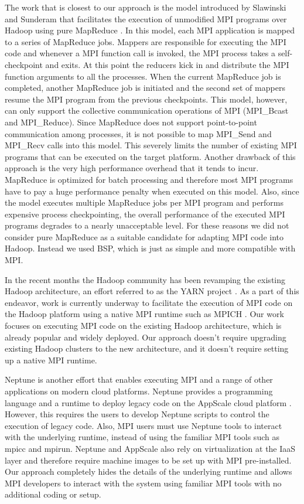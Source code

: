 \documentclass[conference,10pt] {IEEEtran}
\begin{document}
The work that is closest to our approach is the model introduced by Slawinski and Sunderam that facilitates the execution of unmodified MPI programs over Hadoop using pure MapReduce \cite{SS12}. In this model, each MPI application is mapped to a series of MapReduce jobs. Mappers are responsible for executing the MPI code and whenever a MPI function call is invoked, the MPI process takes a self-checkpoint and exits. At this point the reducers kick in and distribute the MPI function arguments to all the processes. When the current MapReduce job is completed, another MapReduce job is initiated and the second set of mappers resume the MPI program from the previous checkpoints. This model, however, can only support the collective communication operations of MPI (MPI\_Bcast and MPI\_Reduce). Since MapReduce does not support point-to-point communication among processes, it is not possible to map MPI\_Send and MPI\_Recv calls into this model. This severely limits the number of existing MPI programs that can be executed on the target platform. Another drawback of this approach is the very high performance overhead that it tends to incur. MapReduce is optimized for batch processing and therefore most MPI programs have to pay a huge performance penalty when executed on this model. Also, since the model executes multiple MapReduce jobs per MPI program and performs expensive process checkpointing, the overall performance of the executed MPI programs degrades to a nearly unacceptable level. For these reasons we did not consider pure MapReduce as a suitable candidate for adapting MPI code into Hadoop. Instead we used BSP, which is just as simple and more compatible with MPI.

In the recent months the Hadoop community has been revamping the existing Hadoop architecture, an effort referred to as the YARN project \cite{url:yarn}. As a part of this endeavor, work is currently underway \cite{url:mpiyarn} to facilitate the execution of MPI code on the Hadoop platform using a native MPI runtime such as MPICH \cite{url:mpich}. Our work focuses on executing MPI code on the existing Hadoop architecture, which is already popular and widely deployed. Our approach doesn't require upgrading existing Hadoop clusters to the new architecture, and it doesn't require setting up a native MPI runtime.

Neptune \cite{Bunch:2011:NDS:1996109.1996120} is another effort that enables executing MPI and a range of other applications on modern cloud platforms. Neptune provides a programming language and a runtime to deploy legacy code on the AppScale cloud platform \cite{6488671}. However, this requires the users to develop Neptune scripts to control the execution of legacy code. Also, MPI users must use Neptune tools to interact with the underlying runtime, instead of using the familiar MPI tools such as mpicc and mpirun. Neptune and AppScale also rely on virtualization at the IaaS layer and therefore require machine images to be set up with MPI pre-installed. Our approach completely hides the details of the underlying runtime and allows MPI developers to interact with the system using familiar MPI tools with no additional coding or setup.
\end{document}
